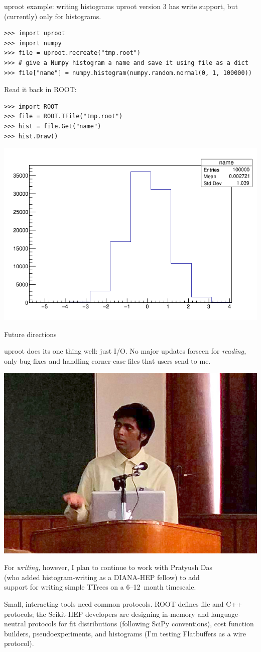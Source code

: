 \documentclass[aspectratio=169]{beamer}
\begin{document}
\begin{frame}[fragile]{uproot example: writing histograms}
\large
\vspace{0.25 cm}
uproot version 3 has write support, but (currently) only for histograms.

\small
\begin{verbatim}
>>> import uproot
>>> import numpy
>>> file = uproot.recreate("tmp.root")
>>> # give a Numpy histogram a name and save it using file as a dict
>>> file["name"] = numpy.histogram(numpy.random.normal(0, 1, 100000))
\end{verbatim}

\vspace{1 cm}
\large
Read it back in ROOT:

\small
\begin{verbatim}
>>> import ROOT
>>> file = ROOT.TFile("tmp.root")
>>> hist = file.Get("name")
>>> hist.Draw()
\end{verbatim}

\vspace{-3.5 cm}
\hfill \includegraphics[width=0.5\linewidth]{root-hist.png}
\end{frame}

\begin{frame}{Future directions}
\vspace{0.5 cm}

uproot does its one thing well: just I/O. No major updates forseen for {\it reading,} only bug-fixes and handling corner-case files that users send to me.

\vspace{0.75 cm}
\hfill \includegraphics[height=2 cm]{pratyush.jpg}

\vspace{-2 cm}
For {\it writing,} however, I plan to continue to work with Pratyush Das \\ (who added histogram-writing as a DIANA-HEP fellow) to add \\ support for writing simple TTrees on a 6--12~month timescale.

\vspace{0.75 cm}
Small, interacting tools need common protocols. ROOT defines file and C++ protocols; the Scikit-HEP developers are designing in-memory and language-neutral protocols for fit distributions (following SciPy conventions), cost function builders, pseudoexperiments, and histograms (I'm testing Flatbuffers as a wire protocol).
\end{frame}
\end{document}
